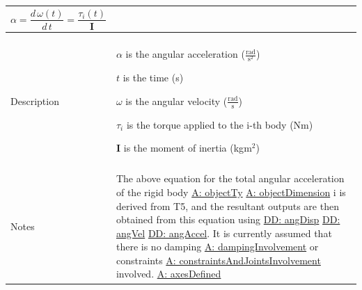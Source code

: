\documentclass[12pt]{article}
\begin{document}
\begin{minipage}{\textwidth}
\begin{tabular}{p{} p{}}
\begin{displaymath}
                                                                             α=\frac{d\,ω\left(t\right)}{d\,t}=\frac{{τ_{i}}\left(t\right)}{\mathbf{I}}
                                                                             \end{displaymath}
                                                                             \\ \midrule \\
                                                                             Description & \begin{symbDescription}
                                                                                           \item{$α$ is the angular acceleration ($\frac{\text{rad}}{\text{s}^{2}}$)}
                                                                                           \item{$t$ is the time (s)}
                                                                                           \item{$ω$ is the angular velocity ($\frac{\text{rad}}{\text{s}}$)}
                                                                                           \item{${τ_{i}}$ is the torque applied to the i-th body (Nm)}
                                                                                           \item{$\mathbf{I}$ is the moment of inertia (kg$\text{m}^{2}$)}
                                                                                           \end{symbDescription}
                                                                                           \\ \midrule \\
                                                                                           Notes & The above equation for the total angular acceleration of the rigid body \hyperref[A:objectTy]{A: objectTy} \hyperref[A:objectDimension]{A: objectDimension} i is derived from T5, and the resultant outputs are then obtained from this equation using \hyperref[DD:angDisp]{DD: angDisp} \hyperref[DD:angVel]{DD: angVel} \hyperref[DD:angAccel]{DD: angAccel}. It is currently assumed that there is no damping \hyperref[A:dampingInvolvement]{A: dampingInvolvement} or constraints \hyperref[A:constraintsAndJointsInvolvement]{A: constraintsAndJointsInvolvement} involved. \hyperref[A:axesDefined]{A: axesDefined}

\end{tabular}
\end{minipage}
\end{document}
